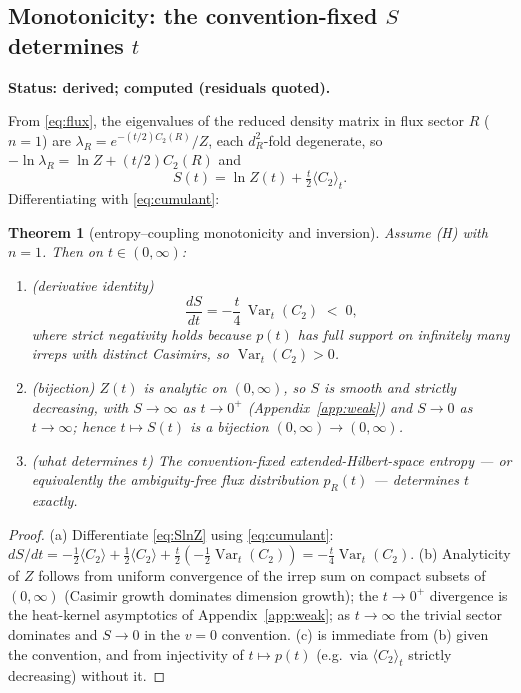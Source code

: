 \documentclass[11pt]{article}
\newtheorem{theorem}{Theorem}
\theoremstyle{remark}
\theoremstyle{plain}
\newcommand{\Var}{\operatorname{Var}}
\begin{document}
\subsection{Monotonicity: the convention-fixed \texorpdfstring{$S$}{S} determines \texorpdfstring{$t$}{t}}\label{sec:mono}

\textbf{Status: derived; computed (residuals quoted).}

From \eqref{eq:flux}, the eigenvalues of the reduced density matrix in flux sector $R$ ($n = 1$) are $\lambda_R = e^{-(t/2)C_2(R)}/Z$, each $d_R^2$-fold degenerate, so $-\ln\lambda_R = \ln Z + (t/2)C_2(R)$ and
\begin{equation}\label{eq:SlnZ}
S(t) = \ln Z(t) + \tfrac{t}{2}\langle C_2\rangle_t.
\end{equation}
Differentiating with \eqref{eq:cumulant}:

\begin{theorem}[entropy--coupling monotonicity and inversion]\label{thm:mono}
Assume (H) with $n = 1$. Then on $t \in (0,\infty)$:
\begin{enumerate}
\item[(a)] \emph{(derivative identity)}
\begin{equation}\label{eq:dSdt}
\frac{dS}{dt} = -\frac{t}{4}\,\Var_t(C_2) \;<\; 0,
\end{equation}
where strict negativity holds because $p(t)$ has full support on infinitely many irreps with distinct Casimirs, so $\Var_t(C_2) > 0$.
\item[(b)] \emph{(bijection)} $Z(t)$ is analytic on $(0,\infty)$, so $S$ is smooth and strictly decreasing, with $S \to \infty$ as $t \to 0^+$ (Appendix~\ref{app:weak}) and $S \to 0$ as $t \to \infty$; hence $t \mapsto S(t)$ is a bijection $(0,\infty) \to (0,\infty)$.
\item[(c)] \emph{(what determines $t$)} The convention-fixed extended-Hilbert-space entropy --- or equivalently the ambiguity-free flux distribution $p_R(t)$ --- determines $t$ exactly.
\end{enumerate}
\end{theorem}

\begin{proof}
(a) Differentiate \eqref{eq:SlnZ} using \eqref{eq:cumulant}: $dS/dt = -\tfrac12\langle C_2\rangle + \tfrac12\langle C_2\rangle + \tfrac{t}{2}(-\tfrac12\Var_t(C_2)) = -\tfrac{t}{4}\Var_t(C_2)$. (b) Analyticity of $Z$ follows from uniform convergence of the irrep sum on compact subsets of $(0,\infty)$ (Casimir growth dominates dimension growth); the $t \to 0^+$ divergence is the heat-kernel asymptotics of Appendix~\ref{app:weak}; as $t \to \infty$ the trivial sector dominates and $S \to 0$ in the $v = 0$ convention. (c) is immediate from (b) given the convention, and from injectivity of $t \mapsto p(t)$ (e.g.\ via $\langle C_2 \rangle_t$ strictly decreasing) without it.
\end{proof}
\end{document}
